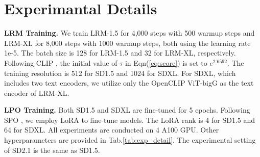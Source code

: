 \section{Experimantal Details}
\label{sec:experimental_detail}

\textbf{LRM Training.} We train LRM-1.5 for 4,000 steps with 500 warmup steps and LRM-XL for 8,000 steps with 1000 warmup steps, both using the learning rate 1e-5. The batch size is 128 for LRM-1.5 and 32 for LRM-XL, respectively. Following CLIP \cite{clip}, the initial value of $\tau$ in Eqn\;(\ref{eq:score}) is set to $e^{2.6592}$. The training resolution is 512 for SD1.5 and 1024 for SDXL. For SDXL, which includes two text encoders, we utilize only the OpenCLIP ViT-bigG \cite{openclip} as the text encoder of LRM-XL.

\textbf{LPO Training.} Both SD1.5 and SDXL are fine-tuned for 5 epochs. Following SPO \cite{spo}, we employ LoRA \cite{lora} to fine-tune models. The LoRA rank is 4 for SD1.5 and 64 for SDXL. All experiments are conducted on 4 A100 GPU. Other hyperparameters are provided in Tab.\;\ref{tab:exp_detail}. The experimental setting of SD2.1 is the same as SD1.5.

\begin{table}[ht]
    \centering
    \vspace{-3mm}
    \caption{Hyperparameters of LPO training.}
    \vskip 0.05in
    \label{tab:exp_detail}
    \footnotesize
\end{table}



